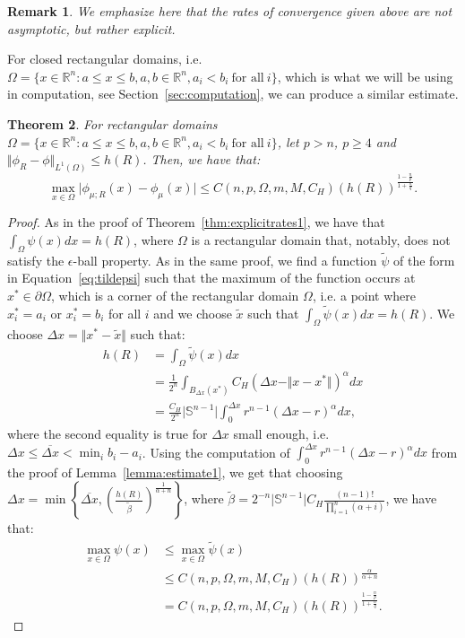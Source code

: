 \documentclass{amsart}
\newtheorem{theorem}{Theorem}
\theoremstyle{lemma}
\newtheorem{remark}[theorem]{Remark}
\theoremstyle{remark}
\begin{document}
\begin{remark}
We emphasize here that the rates of convergence given above are not asymptotic, but rather explicit.
\end{remark}

For closed rectangular domains, i.e. $\Omega = \{ x \in \mathbb{R}^n : a \leq x \leq b, a, b \in \mathbb{R}^n, a_i < b_i \ \text{for all} \ i \}$, which is what we will be using in computation, see Section~\ref{sec:computation}, we can produce a similar estimate.
\begin{theorem}\label{thm:rectangular}
For rectangular domains $\Omega = \{ x \in \mathbb{R}^n : a \leq x \leq b, a, b \in \mathbb{R}^n, a_i < b_i \ \text{for all} \ i \}$, let $p > n$, $p \geq 4$ and $\Vert \phi_{R} - \phi \Vert_{L^{1}(\Omega)} \leq h(R)$. Then, we have that:
\begin{equation}
\max_{x \in \Omega} \vert \phi_{\mu;R}(x) - \phi_{\mu}(x) \vert \leq C(n, p, \Omega, m, M, C_{H}) (h(R))^{\frac{1- \frac{n}{p}}{1 + \frac{n}{q}}}.
\end{equation}
\end{theorem}
\begin{proof}
As in the proof of Theorem~\ref{thm:explicitrates1}, we have that $\int_{\Omega} \psi(x)dx = h(R)$, where $\Omega$ is a rectangular domain that, notably, does not satisfy the $\epsilon$-ball property. As in the same proof, we find a function $\tilde{\psi}$ of the form in Equation~\eqref{eq:tildepsi} such that the maximum of the function occurs at $x^{*} \in \partial \Omega$, which is a corner of the rectangular domain $\Omega$, i.e. a point where $x^{*}_i = a_i$ or $x^{*}_i = b_i$ for all $i$ and we choose $\tilde{x}$ such that $\int_{\Omega} \tilde{\psi}(x)dx = h(R)$. We choose $\Delta x = \Vert x^{*} - \tilde{x} \Vert$ such that:
\begin{align}
h(R) &= \int_{\Omega} \tilde{\psi}(x)dx \\
&= \frac{1}{2^{n}} \int_{B_{\Delta x} (x^{*})} C_{H} (\Delta x - \Vert x - x^{*} \Vert)^{\alpha}dx \\
&= \frac{C_{H}}{2^{n}} \vert \mathbb{S}^{n-1} \vert \int_{0}^{\Delta x} r^{n-1} (\Delta x - r)^{\alpha}dx,
\end{align}
where the second equality is true for $\Delta x$ small enough, i.e. $\Delta x \leq \overline{\Delta x} < \min_{i} b_i - a_i$. Using the computation of $\int_{0}^{\Delta x} r^{n-1} (\Delta x - r)^{\alpha}dx$ from the proof of Lemma~\ref{lemma:estimate1}, we get that choosing $\Delta x = \min \left\{ \overline{\Delta x}, \left( \frac{h(R)}{\tilde{\beta}} \right)^{\frac{1}{\alpha + n}} \right\}$, where $\tilde{\beta} = 2^{-n} \vert \mathbb{S}^{n-1} \vert C_{H} \frac{(n-1)!}{\prod_{i=1}^{n} (\alpha + i)}$, we have that:
\begin{align}
\max_{x \in \Omega} \psi(x) &\leq \max_{x \in \Omega} \tilde{\psi}(x) \\
&\leq C(n, p, \Omega, m, M, C_H) (h(R))^{\frac{\alpha}{\alpha + n}} \\
&=C(n, p, \Omega, m, M, C_H) (h(R))^{\frac{1 - \frac{n}{p}}{1 + \frac{n}{q}}}.
\end{align}
\end{proof}
\end{document}
